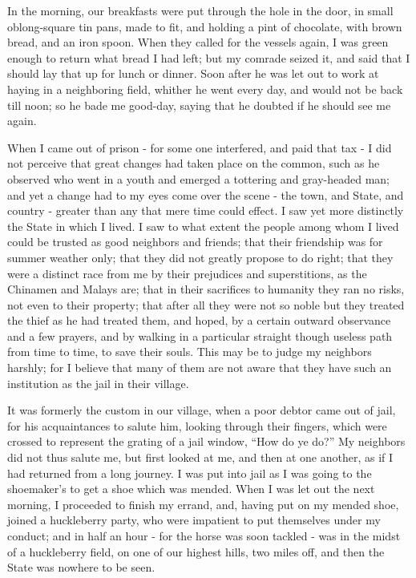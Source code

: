 \documentclass[letterpaper,12pt,english]{sphinxmanual}
\begin{document}
In the morning, our breakfasts were put through the hole in the door, in small oblong-square tin pans, made to fit, and holding a pint of chocolate, with brown bread, and an iron spoon. When they called for the vessels again, I was green enough to return what bread I had left; but my comrade seized it, and said that I should lay that up for lunch or dinner. Soon after he was let out to work at haying in a neighboring field, whither he went every day, and would not be back till noon; so he bade me good-day, saying that he doubted if he should see me again.

When I came out of prison - for some one interfered, and paid that tax - I did not perceive that great changes had taken place on the common, such as he observed who went in a youth and emerged a tottering and gray-headed man; and yet a change had to my eyes come over the scene - the town, and State, and country - greater than any that mere time could effect. I saw yet more distinctly the State in which I lived. I saw to what extent the people among whom I lived could be trusted as good neighbors and friends; that their friendship was for summer weather only; that they did not greatly propose to do right; that they were a distinct race from me by their prejudices and superstitions, as the Chinamen and Malays are; that in their sacrifices to humanity they ran no risks, not even to their property; that after all they were not so noble but they treated the thief as he had treated them, and hoped, by a certain outward observance and a few prayers, and by walking in a particular straight though useless path from time to time, to save their souls. This may be to judge my neighbors harshly; for I believe that many of them are not aware that they have such an institution as the jail in their village.

It was formerly the custom in our village, when a poor debtor came out of jail, for his acquaintances to salute him, looking through their fingers, which were crossed to represent the grating of a jail window, ``How do ye do?'' My neighbors did not thus salute me, but first looked at me, and then at one another, as if I had returned from a long journey. I was put into jail as I was going to the shoemaker's to get a shoe which was mended. When I was let out the next morning, I proceeded to finish my errand, and, having put on my mended shoe, joined a huckleberry party, who were impatient to put themselves under my conduct; and in half an hour - for the horse was soon tackled - was in the midst of a huckleberry field, on one of our highest hills, two miles off, and then the State was nowhere to be seen.
\end{document}
